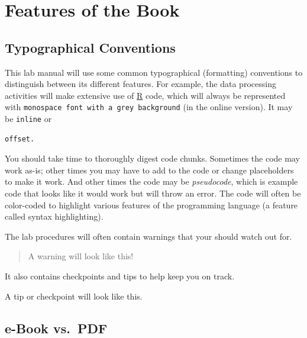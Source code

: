 \documentclass[]{tufte-book}
\begin{document}
\hypertarget{features-of-the-book}{%
\section*{Features of the Book}\label{features-of-the-book}}

\hypertarget{typographical-conventions}{%
\subsection*{\texorpdfstring{\textbf{Typographical Conventions}}{Typographical Conventions}}\label{typographical-conventions}}

This lab manual will use some common typographical (formatting) conventions to distinguish between its different features. For example, the data processing activities will make extensive use of \href{https://cran.r-project.org/}{R} code, which will always be represented with \texttt{monospace\ font\ with\ a\ grey\ background} (in the online version). It may be \texttt{inline} or

\begin{verbatim}
offset.
\end{verbatim}

You should take time to thoroughly digest code chunks. Sometimes the code may work as-is; other times you may have to add to the code or change placeholders to make it work. And other times the code may be \emph{pseudocode}, which is example code that looks like it would work but will throw an error. The code will often be color-coded to highlight various features of the programming language (a feature called syntax highlighting).

The lab procedures will often contain warnings that your should watch out for.

\begin{quote}
A warning will look like this!
\end{quote}

It also contains checkpoints and tips to help keep you on track.

\begin{marginfigure}
A tip or checkpoint will look like this.
\end{marginfigure}

\hypertarget{e-book-vs.-pdf}{%
\subsection*{\texorpdfstring{\textbf{e-Book vs.~PDF}}{e-Book vs.~PDF}}\label{e-book-vs.-pdf}}
\end{document}

